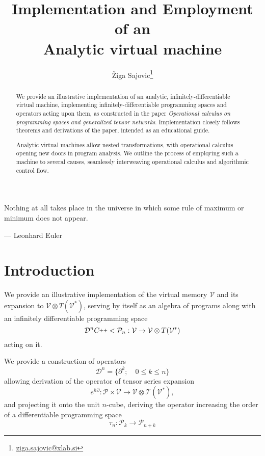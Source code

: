 \documentclass{article}
\title{Implementation and Employment\protect \\of an \protect \\ Analytic virtual machine}
\author{Žiga Sajovic\footnote{\href{mail.to:ziga.sajovic@xlab.si}{ziga.sajovic@xlab.si}}}
\newcommand{\T}{\mathcal{T}}
\newcommand{\VV}{\mathcal{V}}
\newcommand{\CC}{C\nolinebreak\hspace{-.05em}\raisebox{.4ex}{\tiny\bf +}\nolinebreak\hspace{-.10em}\raisebox{.4ex}{\tiny\bf +}}
\def\CC{{C\nolinebreak[4]\hspace{-.05em}\raisebox{.4ex}{\tiny\bf ++}}}
\newcommand{\dP}{\mathcal{P}}
\newcommand{\D}{\partial}
\newcommand{\DD}{\mathcal{D}}
\newcommand{\sumd}{\tau}
\begin{document}
\maketitle

\begin{abstract}
We provide an illustrative implementation of an analytic, infinitely-differentiable virtual machine, implementing infinitely-differentiable programming spaces and operators acting upon them, as constructed in the paper \emph{Operational calculus on programming spaces and generalized tensor networks}\cite{OperationalCalculus}. Implementation closely follows theorems and derivations of the paper, intended as an educational guide.

Analytic virtual machines allow nested transformations, with operational calculus opening new doors in program analysis. We outline the process of employing such a machine to several causes, seamlessly interweaving operational calculus and algorithmic control flow. 
\end{abstract}

\epigraph{Nothing at all takes place in the universe in which some rule of maximum or minimum does not appear.}{--- \textup{Leonhard Euler}}
\clearpage
\tableofcontents
\clearpage
\section{Introduction}\label{sec:introduction}
We provide an illustrative implementation of the virtual memory $\VV$ and its expansion to $\VV\otimes T(\VV^*)$, serving by itself as an algebra of programs along with an infinitely differentiable programming space \cite[Theorem~5.1]{OperationalCalculus}
\begin{equation}
\DD^n\CC<\dP_n:\VV\to\VV\otimes T(\VV^*)
\end{equation}
acting on it.

We provide a construction of operators
\begin{equation}
\DD^n=\{\D^k;\quad 0\le k\le n\}
\end{equation}
allowing derivation of the operator of tensor series expansion \cite[Theorem~5.4]{OperationalCalculus}
 \begin{equation}
                  	e^{h\D}:\dP\times \VV\to \VV\otimes \T(\VV^*),
         \end{equation}
and projecting it onto the unit $n$-cube, deriving the operator increasing the order of a differentiable programming space \cite[Corollary~5.2]{OperationalCalculus}
\begin{equation}\label{eq:sumd}
\sumd_n:\dP_k\to\dP_{n+k}
\end{equation} 
\end{document}
